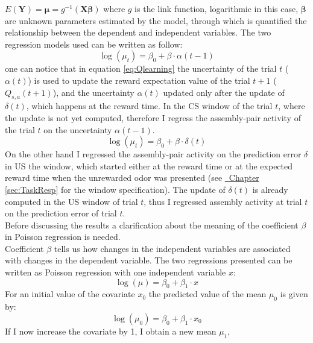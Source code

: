 $E (\mathbf {Y} )={\boldsymbol {\mu }}=g^{-1}(\mathbf {X} {\boldsymbol {\beta }})$ where $g$ is the link function, logarithmic in this case, $\boldsymbol{\beta}$ are unknown parameters estimated by the model, through which is quantified the relationship between the dependent and independent variables. The two regression models used can be written as follow:
\begin{equation}
    \log(\mu_t)=\beta_0+\beta\cdot\alpha(t-1)
    \label{eq:regrAlpha}
\end{equation}
one can notice that in equation \ref{eq:Qlearning} the uncertainty of the trial $t$ ($\alpha(t)$) is used to update the reward expectation value of the trial $t+1$ ($Q_{s,a}(t+1)$), and the uncertainty $\alpha(t)$ updated only after the update of $\delta(t)$, which happens at the reward time. In the CS window of the trial $t$, where the update is not yet computed, therefore I regress the assembly-pair activity of the trial $t$ on the uncertainty $\alpha(t-1)$.
\begin{equation}
    \log(\mu_t)=\beta_0+\beta\cdot\delta(t)
    \label{eq:regrDelta}
\end{equation}
On the other hand I regressed the assembly-pair activity on the prediction error $\delta$ in US the window, which started either at the reward time or at the expected reward time when the unrewarded odor was presented (see \hyperref[sec:TaskResp]{~Chapter \ref*{sec:TaskResp}} for the window specification). The update of $\delta(t)$ is already computed in the US window of trial $t$, thus I regressed assembly activity at trial $t$ on the prediction error of trial $t$.\\
Before discussing the results a clarification about the meaning of the coefficient $\beta$ in Poisson regression is needed.\\Coefficient $\beta$ tells us how changes in the independent variables are associated with changes in the dependent variable. The two regressions presented can be written as Poisson regression with one independent variable $x$:
\begin{equation}
    \log(\mu)=\beta_0+\beta_1\cdot x
    \label{eq:betaCoeff}
\end{equation}
For an initial value of the covariate $x_0$ the predicted value of the mean $\mu_0$ is given by:
\begin{equation*}
    \log(\mu_0)=\beta_0+\beta_1\cdot x_0
    \label{eq:betaCoeff0}
\end{equation*}
If I now increase the covariate by 1, I obtain a new mean $\mu_1$,
